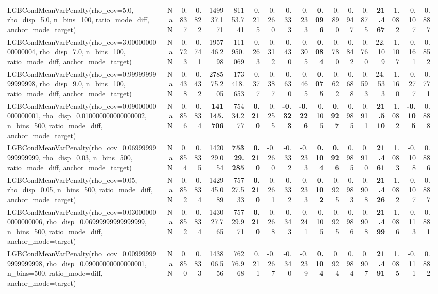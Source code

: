 \documentclass[11pt]{article}
\theoremstyle{plain}
\theoremstyle{definition}
\newcommand{\1}{\mathbf{1}}
\begin{document}
\begin{table}[htbp]
{\begin{tabular}{lrrrrrrrrrrrrrrrrr}
LGBCondMeanVarPenalty(rho\_cov=5.0, rho\_disp=5.0, n\_bins=100, ratio\_mode=diff, anchor\_mode=target) & NaN & 0.837 & 0.822 & 149937.171 & 81153.741 & 0.215 & -0.260 & -0.333 & -0.233 & \textbf{0.096} & 0.890 & 0.947 & 0.875 & \textbf{21.467} & 1.082 & -0.107 & 0.887 \\
LGBCondMeanVarPenalty(rho\_cov=3.0000000000000004, rho\_disp=7.0, n\_bins=100, ratio\_mode=diff, anchor\_mode=target) & NaN & 0.723 & 0.741 & 195746.298 & 111950.069 & 0.263 & -0.312 & -0.430 & -0.305 & \textbf{0.084} & 0.780 & 0.842 & 0.760 & 22.109 & 1.107 & -0.161 & 0.852 \\
LGBCondMeanVarPenalty(rho\_cov=0.9999999999999998, rho\_disp=9.0, n\_bins=100, ratio\_mode=diff, anchor\_mode=target) & NaN & 0.438 & 0.432 & 278575.205 & 173418.653 & 0.377 & -0.387 & -0.630 & -0.465 & \textbf{0.075} & 0.622 & 0.688 & 0.593 & 24.533 & 1.160 & -0.277 & 0.771 \\
LGBCondMeanVarPenalty(rho\_cov=0.09000000000000001, rho\_disp=0.010000000000000002, n\_bins=500, ratio\_mode=diff, anchor\_mode=target) & NaN & 0.856 & 0.834 & \textbf{141145.706} & 75434.277 & \textbf{0.210} & -0.255 & \textbf{-0.323} & \textbf{-0.226} & 0.105 & \textbf{0.927} & 0.985 & 0.911 & \textbf{21.510} & 1.082 & \textbf{-0.105} & 0.888 \\
LGBCondMeanVarPenalty(rho\_cov=0.06999999999999999, rho\_disp=0.03, n\_bins=500, ratio\_mode=diff, anchor\_mode=target) & NaN & 0.854 & 0.835 & 142029.054 & \textbf{75329.285} & \textbf{0.210} & -0.260 & -0.332 & -0.233 & \textbf{0.104} & \textbf{0.926} & 0.985 & 0.910 & \textbf{21.461} & 1.083 & -0.108 & 0.886 \\
LGBCondMeanVarPenalty(rho\_cov=0.05, rho\_disp=0.05, n\_bins=500, ratio\_mode=diff, anchor\_mode=target) & NaN & 0.852 & 0.834 & 142945.089 & 75727.533 & \textbf{0.210} & -0.261 & -0.332 & -0.233 & \textbf{0.102} & 0.925 & 0.983 & 0.908 & \textbf{21.426} & 1.082 & -0.107 & 0.887 \\
LGBCondMeanVarPenalty(rho\_cov=0.030000000000000006, rho\_disp=0.06999999999999999, n\_bins=500, ratio\_mode=diff, anchor\_mode=target) & NaN & 0.852 & 0.834 & 143027.765 & 75729.971 & \textbf{0.210} & -0.268 & -0.343 & -0.241 & 0.105 & 0.925 & 0.986 & 0.908 & \textbf{21.499} & 1.086 & -0.113 & 0.881 \\
LGBCondMeanVarPenalty(rho\_cov=0.009999999999999998, rho\_disp=0.09000000000000001, n\_bins=500, ratio\_mode=diff, anchor\_mode=target) & NaN & 0.850 & 0.833 & 143806.556 & 76276.968 & 0.211 & -0.267 & -0.340 & -0.239 & \textbf{0.104} & 0.924 & 0.984 & 0.907 & \textbf{21.491} & 1.085 & -0.111 & 0.882 \\

\end{tabular}}
\end{table}
\end{document}
